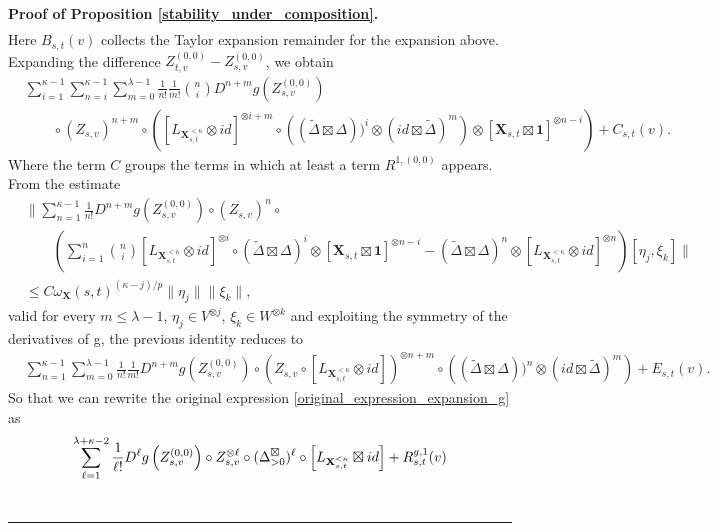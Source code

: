 \documentclass{article}%
\newenvironment{proof}[1][Proof]{\noindent\textbf{#1.} }{\ \rule{0.5em}{0.5em}}
\begin{document}
\begin{proof}[Proof of Proposition 
\ref{stability_under_composition}]
\begin{align*}
\end{align*}
Here $B_{s,t}(v)$ collects the Taylor expansion remainder for the expansion above.\newline
Expanding the difference $Z^{(0,0)}_{t,v} - Z^{(0,0)}_{s,v}$, we obtain
\begin{align*}
&\sum_{i = 1}^{\kappa -1} \sum_{n = i}^{\kappa -1} \sum_{m = 0}^{\lambda -1} \frac{1}{n!} \frac{1}{m!} \binom{n}{i} D^{n+m}g(Z^{(0,0)}_{s,v})\\
& \qquad \circ (Z_{s,v})^{n+m} \circ \left([L_{\mathbf{X}^{<\kappa}_{s,t}} \otimes id]^{\otimes i + m} \circ \left((\tilde{\Delta} \boxtimes \Delta))^{i} \otimes ( id \boxtimes \tilde{\Delta})^{m} \right) \otimes \left[\mathbf{X}_{s,t} \boxtimes \mathbf{1} \right]^{\otimes n-i}\right) + C_{s,t}(v).
\end{align*}
Where the term $C$ groups the terms in which at least a term $R^{1, (0,0)}$ appears.\newline
From the estimate
\begin{align*}
&\Bigg\| \sum_{n = 1}^{\kappa -1}  \frac{1}{n!}  D^{n+m}g(Z^{(0,0)}_{s,v})\circ (Z_{s,v})^{n} \circ\\
&\qquad \left(\sum_{i = 1}^{n}\binom{n}{i} [L_{\mathbf{X}^{<\kappa}_{s,t}} \otimes id]^{\otimes i } \circ (\tilde{\Delta} \boxtimes \Delta)^{i}  \otimes \left[\mathbf{X}_{s,t} \boxtimes \mathbf{1} \right]^{\otimes n-i} - (\tilde{\Delta} \boxtimes \Delta)^{n}  \otimes [L_{\mathbf{X}^{<\kappa}_{s,t}} \otimes id]^{\otimes n } \right)[\eta_j, \xi_k]\Bigg\|\\
&\leq C \omega_\mathbf{X}(s,t)^{(\kappa - j)/p} \|\eta_j\| \|\xi_k \|,
\end{align*}
valid for every $m \leq \lambda -1$, $\eta_j \in V^{\otimes j}$, $\xi_k \in W^{\otimes k}$ and exploiting the symmetry of the derivatives of g, the previous identity reduces to
\begin{align}
&\sum_{n = 1}^{\kappa -1} \sum_{m = 0}^{\lambda -1} \frac{1}{n!} \frac{1}{m!} D^{n+m}g(Z^{(0,0)}_{s,v}) \circ (Z_{s,v} \circ [L_{\mathbf{X}^{<\kappa}_{s,t}} \otimes id])^{\otimes n + m} \circ \left((\tilde{\Delta} \boxtimes \Delta))^{n} \otimes ( id \boxtimes \tilde{\Delta})^{m} \right) + E_{s,t}(v).
\end{align}
So that we can rewrite the original expression \eqref{original_expression_expansion_g} as 
\[
\sum_{\ell=1}^{\lambda+\kappa-2} \frac{1}{\ell!}
D^\ell g\left(Z^{(0,0)}_{s,v}\right)
\circ Z^{\otimes \ell}_{s,v}
\circ (\Delta^{\boxtimes}_{>0})^\ell \circ \left[L_{\mathbf{X}^{< \kappa}_{s,t}} \boxtimes id \right] + R^{g, 1}_{s,t}(v)\\
\]
\end{proof}
\end{document}
